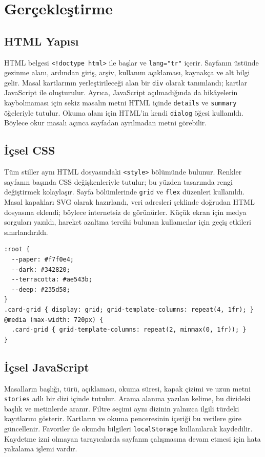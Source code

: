 \documentclass[12pt,a4paper]{article}
\begin{document}
\section{Gerçekleştirme}
\subsection{HTML Yapısı}
HTML belgesi \texttt{<!doctype html>} ile başlar ve \texttt{lang="tr"} içerir. Sayfanın üstünde gezinme alanı, ardından giriş, arşiv, kullanım açıklaması, kaynakça ve alt bilgi gelir. Masal kartlarının yerleştirileceği alan bir \texttt{div} olarak tanımlandı; kartlar JavaScript ile oluşturulur. Ayrıca, JavaScript açılmadığında da hikâyelerin kaybolmaması için sekiz masalın metni HTML içinde \texttt{details} ve \texttt{summary} öğeleriyle tutulur. Okuma alanı için HTML'in kendi \texttt{dialog} öğesi kullanıldı. Böylece okur masalı açınca sayfadan ayrılmadan metni görebilir.

\subsection{İçsel CSS}
Tüm stiller aynı HTML dosyasındaki \texttt{<style>} bölümünde bulunur. Renkler sayfanın başında CSS değişkenleriyle tutulur; bu yüzden tasarımda rengi değiştirmek kolaylaşır. Sayfa bölümlerinde \texttt{grid} ve \texttt{flex} düzenleri kullanıldı. Masal kapakları SVG olarak hazırlandı, veri adresleri şeklinde doğrudan HTML dosyasına eklendi; böylece internetsiz de görünürler. Küçük ekran için medya sorguları yazıldı, hareket azaltma tercihi bulunan kullanıcılar için geçiş etkileri sınırlandırıldı.

\begin{lstlisting}[caption={İçsel CSS'ten bir bölüm}]
:root {
  --paper: #f7f0e4;
  --dark: #342820;
  --terracotta: #ae543b;
  --deep: #235d58;
}
.card-grid { display: grid; grid-template-columns: repeat(4, 1fr); }
@media (max-width: 720px) {
  .card-grid { grid-template-columns: repeat(2, minmax(0, 1fr)); }
}
\end{lstlisting}

\subsection{İçsel JavaScript}
Masalların başlığı, türü, açıklaması, okuma süresi, kapak çizimi ve uzun metni \texttt{stories} adlı bir dizi içinde tutulur. Arama alanına yazılan kelime, bu dizideki başlık ve metinlerde aranır. Filtre seçimi aynı dizinin yalnızca ilgili türdeki kayıtlarını gösterir. Kartların ve okuma penceresinin içeriği bu verilere göre güncellenir. Favoriler ile okundu bilgileri \texttt{localStorage} kullanılarak kaydedilir. Kaydetme izni olmayan tarayıcılarda sayfanın çalışmasına devam etmesi için hata yakalama işlemi vardır.
\end{document}
